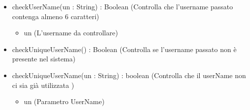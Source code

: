 \begin{description}
\begin{itemize}
\item checkUserName(un : String) : Boolean (Controlla che l'username passato contenga almeno 6 caratteri)\begin{itemize}
\item un (L'username da controllare)
\end{itemize}

\item checkUniqueUserName() : Boolean (Controlla se l'username passato non è presente nel sistema)
\item checkUniqueUserName(un : String) : boolean (Controlla che il userName non ci sia già utilizzata )\begin{itemize}
\item un (Parametro UserName)
\end{itemize}

\end{itemize}

\end{description}

\vspace{0.5cm}
\hypertarget{server::validator::QuestionnaireCheck}{}
